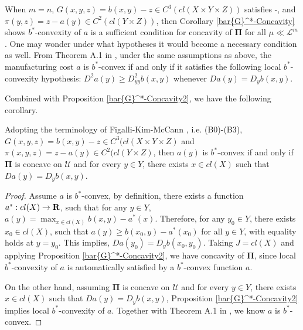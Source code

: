 When $m=n$, $G(x,y,z)= b(x,y)-z \in C^3(cl(X\times Y \times Z)
)$ satisfies \Gzero-\Geight,  and $\pi(y,z)=z-a(y) \in C^2( cl( Y \times Z)
)$, then Corollary \ref{bar{G}^*-Concavity} shows $b^*$-convexity of $a$ is a sufficient condition for
concavity of $\pmb \Pi$  for all $\mu\ll \mathcal{L}^m$. One may wonder under what hypotheses it would become a necessary condition as well. From Theorem A.1 in \cite{KimMcCann10}, under the same assumptions as above, the manufacturing cost $a$ is $b^*$-convex if and only if it satisfies the following local $b^*$-convexity hypothesis: $D^2a(y)\ge D^2_{yy}b(x,y)$ whenever $Da(y) = D_{y}b(x,y)$. 
\medskip

Combined with Proposition \ref{bar{G}^*-Concavity2}, we have the following corollary.
\medskip

\begin{corollary}
	Adopting the terminology of Figalli-Kim-McCann \cite{FigalliKimMcCann11},  i.e. (B0)-(B3), $G(x,y,z) = b(x,y)- z \in C^3(cl(X\times Y \times Z)$ and 
	$\pi(x,y,z) = z -a(y) \in C^2( cl( Y \times Z)$, then $a(y)$ is $b^*$-convex if  and only if $\mathbf \Pi$ is concave on $\mathcal U$ and for every $y \in Y$, there exists $x \in cl(X)$ such that $Da(y) = D_y b(x,y)$.
\end{corollary}

\begin{proof}
	Assume $a$ is $b^*$-convex, by definition, there exists a function  $a^*: cl(X) \rightarrow {\mathbf R}$, such that for any $y\in Y$, $a(y) = \max_{x\in cl(X)} b(x,y) - a^*(x)$. Therefore, for any $y_0 \in Y$, there exists $x_0 \in cl(X)$, such that $a(y) \ge b(x_0,y) - a^*(x_0)$ for all $y \in Y$, with equality holds at $y = y_0$. This implies, $Da(y_0) = D_y b(x_0, y_0)$. Taking $J=cl(X)$ and applying Proposition \ref{bar{G}^*-Concavity2}, we have concavity of $\mathbf \Pi$, since local $b^*$-convexity of $a$ is automatically satisfied by a $b^*$-convex function $a$. 
	
	On the other hand, assuming $\mathbf \Pi$ is concave on $\mathcal U$ and for every $y \in Y$, there exists $x \in cl(X)$ such that $Da(y) = D_y b(x,y)$, Proposition \ref{bar{G}^*-Concavity2} implies local $b^*$-convexity of $a$. Together with Theorem A.1 in \cite{KimMcCann10}, we know $a$ is $b^*$-convex.
\end{proof}


































